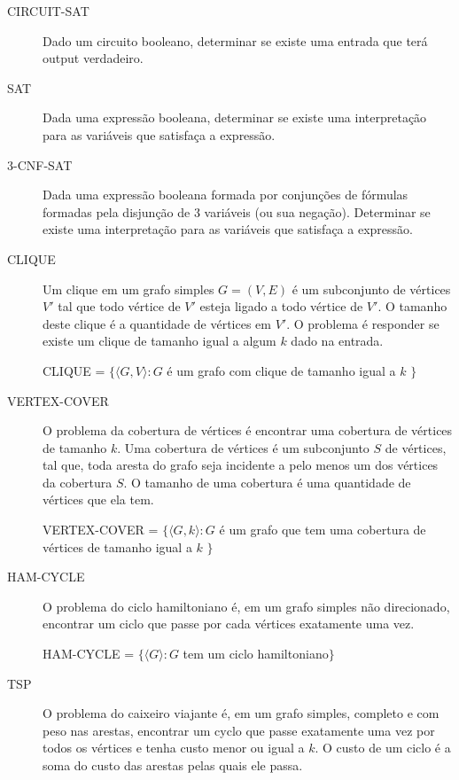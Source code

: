 \documentclass[12pt]{article}
\begin{document}
\begin{description}

\item[CIRCUIT-SAT]
Dado um circuito booleano, 
determinar se existe uma entrada que terá output verdadeiro.

\item[SAT]
Dada uma expressão booleana, 
determinar se existe uma interpretação para as variáveis que 
satisfaça a expressão.

\item[3-CNF-SAT]
Dada uma expressão booleana formada por conjunções de fórmulas formadas 
pela disjunção de 3 variáveis (ou sua negação). 
Determinar se existe uma interpretação para as variáveis que satisfaça 
a expressão.


\item[CLIQUE]

Um clique em um grafo simples $G=(V,E)$ é um subconjunto de 
vértices $V'$ tal que todo vértice de $V'$ esteja ligado a todo vértice 
de $V'$. 
O tamanho deste clique é a quantidade de vértices em $V'$.
O problema é responder se existe um clique de tamanho igual a algum $k$ 
dado na entrada.

CLIQUE = $\{\langle G,V\rangle : G$ é um grafo com clique de tamanho igual a $k$ $\}$

\item[VERTEX-COVER]

O problema da cobertura de vértices é encontrar uma cobertura de vértices de tamanho $k$. 
Uma cobertura de vértices é um subconjunto $S$ de vértices, tal que, toda aresta do grafo seja incidente a pelo menos um dos vértices da cobertura $S$.
O tamanho de uma cobertura é uma quantidade de vértices que ela tem.

VERTEX-COVER = $\{\langle G,k\rangle : G$ é um grafo que tem uma cobertura de vértices de tamanho igual a $k$ $\}$

\item[HAM-CYCLE]

O problema do ciclo hamiltoniano é, em um grafo simples não direcionado, encontrar um ciclo que passe por cada vértices exatamente uma vez.

HAM-CYCLE = $\{\langle G\rangle : G$ tem um ciclo hamiltoniano$\}$


\item[TSP]

O problema do caixeiro viajante é, em um grafo simples, completo e com peso nas arestas, encontrar um cyclo que passe exatamente uma vez por todos os vértices e tenha custo menor ou igual a $k$.
O custo de um ciclo é a soma do custo das arestas pelas quais ele passa.


\end{description}
\end{document}
